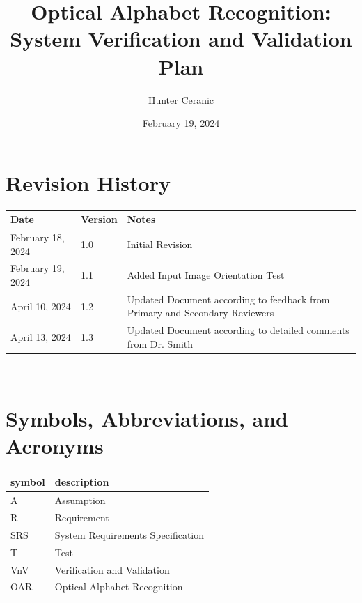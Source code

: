 \documentclass[12pt, titlepage]{article}
\begin{document}
\title{Optical Alphabet Recognition: System Verification and Validation Plan} 
\author{Hunter Ceranic}
\date{February 19, 2024}
	
\maketitle


\section*{Revision History}

\begin{tabularx}{\textwidth}{p{3cm}p{2cm}X}
\toprule {\bf Date} & {\bf Version} & {\bf Notes}\\
\midrule
February 18, 2024 & 1.0 & Initial Revision\\
February 19, 2024 & 1.1 & Added Input Image Orientation Test\\
April 10, 2024 & 1.2 & Updated Document according to feedback from Primary and Secondary Reviewers\\
April 13, 2024 & 1.3 & Updated Document according to detailed comments from Dr. Smith\\
\bottomrule
\end{tabularx}

~\\

\newpage

\tableofcontents

\newpage

\section{Symbols, Abbreviations, and Acronyms}

\renewcommand{\arraystretch}{1.2}
\begin{tabular}{l l} 
  \toprule		
  \textbf{symbol} & \textbf{description}\\
  \midrule 
  A & Assumption\\
  R & Requirement\\
  SRS & System Requirements Specification\\
  T & Test\\
  VnV & Verification and Validation\\
  OAR & Optical Alphabet Recognition\\
  \bottomrule
\end{tabular}\\
\end{document}
